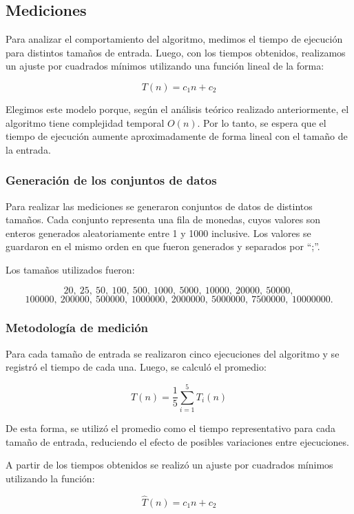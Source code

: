 \subsection{Mediciones}

Para analizar el comportamiento del algoritmo, medimos el tiempo de ejecución para distintos tamaños de entrada. Luego, con los tiempos obtenidos, realizamos un ajuste por cuadrados mínimos utilizando una función lineal de la forma:

\[
T(n) = c_1n + c_2
\]

Elegimos este modelo porque, según el análisis teórico realizado anteriormente, el algoritmo tiene complejidad temporal $O(n)$. Por lo tanto, se espera que el tiempo de ejecución aumente aproximadamente de forma lineal con el tamaño de la entrada.

\subsubsection{Generación de los conjuntos de datos}

Para realizar las mediciones se generaron conjuntos de datos de distintos tamaños. Cada conjunto representa una fila de monedas, cuyos valores son enteros generados aleatoriamente entre 1 y 1000 inclusive. Los valores se guardaron en el mismo orden en que fueron generados y separados por ``;''.

Los tamaños utilizados fueron:

\[
20,\ 25,\ 50,\ 100,\ 500,\ 1000,\ 5000,\ 10000,\ 20000,\ 50000,
\]
\[
100000,\ 200000,\ 500000,\ 1000000,\ 2000000,\ 5000000,\ 7500000,\ 10000000.
\]

\newpage
\subsubsection{Metodología de medición}

Para cada tamaño de entrada se realizaron cinco ejecuciones del algoritmo y se registró el tiempo de cada una. Luego, se calculó el promedio:

\[
T(n) = \frac{1}{5}\sum_{i=1}^{5} T_i(n)
\]

De esta forma, se utilizó el promedio como el tiempo representativo para cada tamaño de entrada, reduciendo el efecto de posibles variaciones entre ejecuciones.

A partir de los tiempos obtenidos se realizó un ajuste por cuadrados mínimos utilizando la función:

\[
\hat{T}(n) = c_1n + c_2
\]

